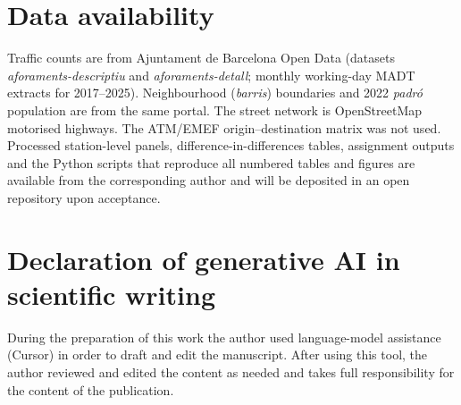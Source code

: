 \documentclass[a4paper,fleqn]{cas-dc}
\begin{document}
\section*{Data availability}

Traffic counts are from Ajuntament de Barcelona Open Data (datasets
\emph{aforaments-descriptiu} and \emph{aforaments-detall}; monthly working-day
MADT extracts for 2017--2025). Neighbourhood (\emph{barris}) boundaries and
2022 \emph{padr\'o} population are from the same portal. The street network is
OpenStreetMap motorised highways. The ATM/EMEF origin--destination matrix was
not used. Processed station-level panels, difference-in-differences tables,
assignment outputs and the Python scripts that reproduce all numbered tables
and figures are available from the corresponding author and will be deposited
in an open repository upon acceptance.

\section*{Declaration of generative AI in scientific writing}

During the preparation of this work the author used language-model assistance
(Cursor) in order to draft and edit the manuscript. After using this tool, the
author reviewed and edited the content as needed and takes full responsibility
for the content of the publication.



\end{document}
